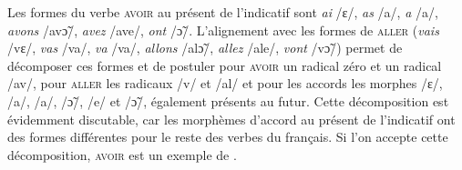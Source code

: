 {      Les formes du verbe \textsc{avoir} au présent de l'indicatif sont \textit{ai} /ɛ/,  \textit{as} /a/, \textit{a} /a/, \textit{avons} /av\~{ɔ}/, \textit{avez} /ave/, \textit{ont} /\~{ɔ}/. L'alignement avec les formes de \textsc{aller} (\textit{vais} /vɛ/, \textit{vas} /va/, \textit{va} /va/, \textit{allons} /al\~{ɔ}/, \textit{allez} /ale/, \textit{vont} /v\~{ɔ}/) permet de décomposer ces formes et de postuler pour \textsc{avoir} un radical zéro et un radical /av/, pour \textsc{aller} les radicaux /v/ et /al/ et pour les accords les morphes /ɛ/, /a/, /a/, /\~{ɔ}/, /e/ et /\~{ɔ}/, également présents au futur. Cette décomposition est évidemment discutable, car les morphèmes d'accord au présent de l'indicatif ont des formes différentes pour le reste des verbes du français. Si l'on accepte cette décomposition, \textsc{avoir} est un exemple de .
}
